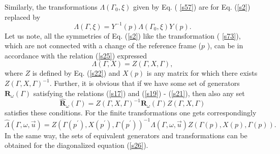 \documentclass[a4paper,a4paper]{article}
\begin{document}
Similarly, the transformations $\Lambda (\Gamma _{0},\xi )$ given by Eq. (%
\ref{s57}) are for Eq. (\ref{s2}) replaced by 
\begin{equation}
\Lambda (\Gamma ,\xi )=Y^{-1}(p)\Lambda (\Gamma _{0},\xi )Y(p).  \label{s73}
\end{equation}%
Let us note, all the symmetries of Eq. (\ref{s2}) like the transformation (%
\ref{s73}), which are not connected with a change of the reference frame ($p$%
), can be in accordance with the relation (\ref{s25}) expressed 
\begin{equation}
\Lambda (\Gamma ,X)=Z(\Gamma ,X,\Gamma ),  \label{s74}
\end{equation}%
where $Z$ is defined by Eq. (\ref{s22}) and $X(p)$ is any matrix for which
there exists $Z(\Gamma ,X,\Gamma )^{-1}$. Further, it is obvious that if we
have some set of generators $\mathbf{R}_{\omega }(\Gamma )$ satisfying the
relations (\ref{s17}) and (\ref{s19}) - (\ref{s21}), then also any set 
\begin{equation}
\mathbf{\hat{R}}_{\omega }(\Gamma )=Z(\Gamma ,X,\Gamma )^{-1}\mathbf{R}%
_{\omega }(\Gamma )Z(\Gamma ,X,\Gamma )  \label{s75}
\end{equation}%
satisfies these conditions. For the finite transformations one gets
correspondingly 
\begin{equation}
\hat{\Lambda}(\Gamma ,\omega ,\vec{u})=Z\left( \Gamma (p^{\prime
}),X(p^{\prime }),\Gamma (p^{\prime })\right) ^{-1}\Lambda (\Gamma ,\omega ,%
\vec{u})Z\left( \Gamma (p),X(p),\Gamma (p)\right) .  \label{s76}
\end{equation}%
In the same way, the sets of equivalent generators and transformations can
be obtained for the diagonalized equation (\ref{s26}).
\end{document}
